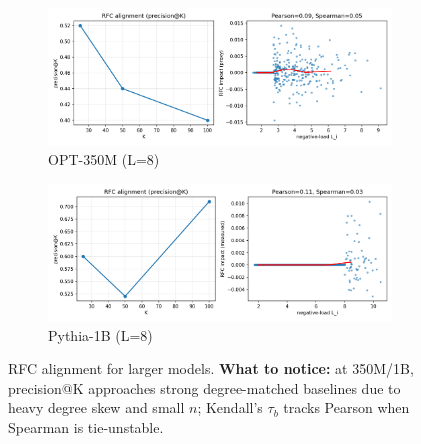 \documentclass[11pt]{article}
\newcommand{\1}{\mathbf{1}}
\begin{document}
\begin{figure}[t]
\centering
\begin{subfigure}[t]{0.48\textwidth}
\includegraphics[width=\linewidth]{figs/rfc_alignment_facebook_opt-350m_residual_L8.png}
\caption{OPT-350M (L=8)}
\end{subfigure}\hfill
\begin{subfigure}[t]{0.48\textwidth}
\includegraphics[width=\linewidth]{figs/rfc_alignment_EleutherAI_pythia-1b_residual_L8.png}
\caption{Pythia-1B (L=8)}
\end{subfigure}
\caption{RFC alignment for larger models. \textbf{What to notice:} at 350M/1B, precision@K approaches strong degree-matched baselines due to heavy degree skew and small $n$; Kendall's $\tau_b$ tracks Pearson when Spearman is tie-unstable.}
\label{fig:rfc_alignment_panel_big}
\end{figure}
\end{document}

